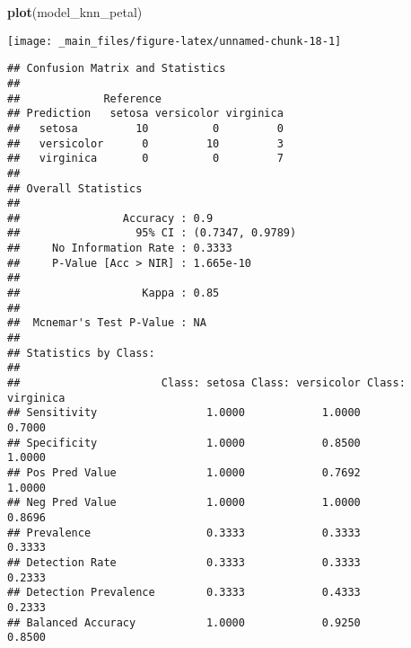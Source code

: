 \documentclass[]{book}
\newenvironment{Shaded}{\begin{snugshade}}{\end{snugshade}}
\newcommand{\CommentTok}[1]{\textcolor[rgb]{0.56,0.35,0.01}{\textit{#1}}}
\newcommand{\DataTypeTok}[1]{\textcolor[rgb]{0.13,0.29,0.53}{#1}}
\newcommand{\KeywordTok}[1]{\textcolor[rgb]{0.13,0.29,0.53}{\textbf{#1}}}
\newcommand{\NormalTok}[1]{#1}
\newcommand{\OperatorTok}[1]{\textcolor[rgb]{0.81,0.36,0.00}{\textbf{#1}}}
\newcommand{\StringTok}[1]{\textcolor[rgb]{0.31,0.60,0.02}{#1}}
\begin{document}
\begin{Shaded}
\begin{Highlighting}[]
\KeywordTok{plot}\NormalTok{(model_knn_petal)}
\end{Highlighting}
\end{Shaded}

\begin{center}\texttt{[image: \_main\_files/figure-latex/unnamed-chunk-18-1]} \end{center}

\begin{Shaded}
\end{Shaded}

\begin{verbatim}
## Confusion Matrix and Statistics
## 
##             Reference
## Prediction   setosa versicolor virginica
##   setosa         10          0         0
##   versicolor      0         10         3
##   virginica       0          0         7
## 
## Overall Statistics
##                                           
##                Accuracy : 0.9             
##                  95% CI : (0.7347, 0.9789)
##     No Information Rate : 0.3333          
##     P-Value [Acc > NIR] : 1.665e-10       
##                                           
##                   Kappa : 0.85            
##                                           
##  Mcnemar's Test P-Value : NA              
## 
## Statistics by Class:
## 
##                      Class: setosa Class: versicolor Class: virginica
## Sensitivity                 1.0000            1.0000           0.7000
## Specificity                 1.0000            0.8500           1.0000
## Pos Pred Value              1.0000            0.7692           1.0000
## Neg Pred Value              1.0000            1.0000           0.8696
## Prevalence                  0.3333            0.3333           0.3333
## Detection Rate              0.3333            0.3333           0.2333
## Detection Prevalence        0.3333            0.4333           0.2333
## Balanced Accuracy           1.0000            0.9250           0.8500
\end{verbatim}
\end{document}
